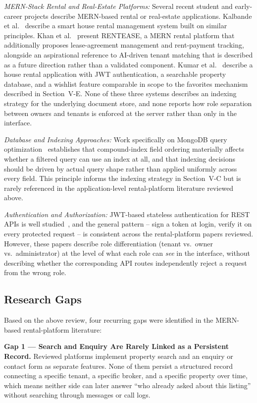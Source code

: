 \documentclass[10pt,twocolumn]{article}
\begin{document}
\textit{MERN-Stack Rental and Real-Estate Platforms:} Several recent student and early-career projects describe MERN-based rental or real-estate applications. Kalbande et al.~\cite{kalbande2023} describe a smart house rental management system built on similar principles. Khan et al.~\cite{khan2025} present RENTEASE, a MERN rental platform that additionally proposes lease-agreement management and rent-payment tracking, alongside an aspirational reference to AI-driven tenant matching that is described as a future direction rather than a validated component. Kumar et al.~\cite{kumar2024} describe a house rental application with JWT authentication, a searchable property database, and a wishlist feature comparable in scope to the favorites mechanism described in Section~V-E. None of these three systems describes an indexing strategy for the underlying document store, and none reports how role separation between owners and tenants is enforced at the server rather than only in the interface.

\textit{Database and Indexing Approaches:} Work specifically on MongoDB query optimization~\cite{nuriev2024,tao2024} establishes that compound-index field ordering materially affects whether a filtered query can use an index at all, and that indexing decisions should be driven by actual query shape rather than applied uniformly across every field. This principle informs the indexing strategy in Section~V-C but is rarely referenced in the application-level rental-platform literature reviewed above.

\textit{Authentication and Authorization:} JWT-based stateless authentication for REST APIs is well studied~\cite{neumann2021,dalimunthe2023}, and the general pattern -- sign a token at login, verify it on every protected request -- is consistent across the rental-platform papers reviewed. However, these papers describe role differentiation (tenant vs.\ owner vs.\ administrator) at the level of what each role can \emph{see} in the interface, without describing whether the corresponding API routes independently reject a request from the wrong role.

\subsection{Research Gaps}
Based on the above review, four recurring gaps were identified in the MERN-based rental-platform literature:

\smallskip
\noindent\textbf{Gap 1 --- Search and Enquiry Are Rarely Linked as a Persistent Record.} Reviewed platforms implement property search and an enquiry or contact form as separate features. None of them persist a structured record connecting a specific tenant, a specific broker, and a specific property over time, which means neither side can later answer ``who already asked about this listing'' without searching through messages or call logs.
\end{document}
